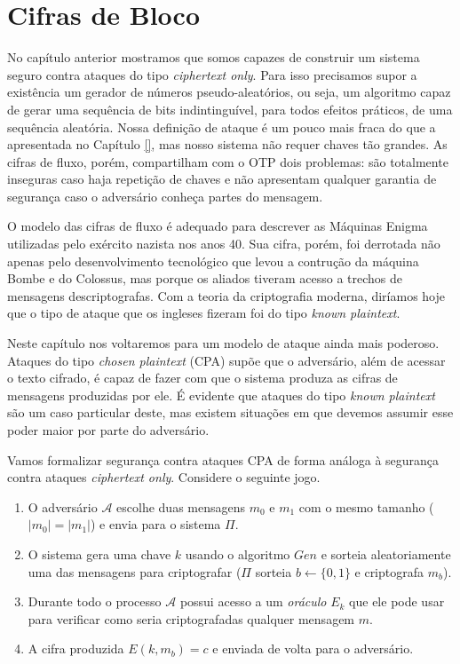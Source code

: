 \chapter{Cifras de Bloco}
\label{cha:cifras-de-bloco}

No capítulo anterior mostramos que somos capazes de construir um sistema seguro contra ataques do tipo {\em ciphertext only}.
Para isso precisamos supor a existência um gerador de números pseudo-aleatórios, ou seja, um algoritmo capaz de gerar uma sequência de bits indintinguível, para todos efeitos práticos, de uma sequência aleatória.
Nossa definição de ataque é um pouco mais fraca do que a apresentada no Capítulo \ref{}, mas nosso sistema não requer chaves tão grandes.
As cifras de fluxo, porém, compartilham com o OTP dois problemas: são totalmente inseguras caso haja repetição de chaves e não apresentam qualquer garantia de segurança caso o adversário conheça partes do mensagem.

O modelo das cifras de fluxo é adequado para descrever as Máquinas Enigma utilizadas pelo exército nazista nos anos 40.
Sua cifra, porém, foi derrotada não apenas pelo desenvolvimento tecnológico que levou a contrução da máquina Bombe e do Colossus, mas porque os aliados tiveram acesso a trechos de mensagens descriptografas.
Com a teoria da criptografia moderna, diríamos hoje que o tipo de ataque que os ingleses fizeram foi do tipo {\em known plaintext}.

Neste capítulo nos voltaremos para um modelo de ataque ainda mais poderoso.
Ataques do tipo {\em chosen plaintext} (CPA) supõe que o adversário, além de acessar o texto cifrado, é capaz de fazer com que o sistema produza as cifras de mensagens produzidas por ele.
É evidente que ataques do tipo {\em known plaintext} são um caso particular deste, mas existem situações em que devemos assumir esse poder maior por parte do adversário.

Vamos formalizar segurança contra ataques CPA de forma análoga à segurança contra ataques {\em ciphertext only}.
Considere o seguinte jogo.
\begin{enumerate}
\item O adversário $\mathcal{A}$ escolhe duas mensagens $m_0$ e $m_1$ com o mesmo tamanho ($|m_0| = |m_1|$) e envia para o sistema $\Pi$.
\item O sistema gera uma chave $k$ usando o algoritmo $Gen$ e sorteia aleatoriamente uma das mensagens para criptografar ($\Pi$ sorteia $b \leftarrow \{0, 1\}$ e criptografa $m_b$).
\item Durante todo o processo $\mathcal{A}$ possui acesso a um {\em oráculo} $E_k$ que ele pode usar para verificar como seria criptografadas qualquer mensagem $m$.
\item A cifra produzida $E(k, m_b) = c$ e enviada de volta para o adversário.
\end{enumerate}

